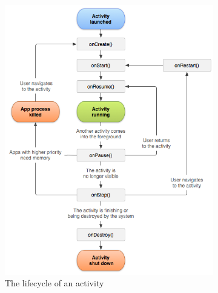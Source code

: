 \begin{figure}[H]
  \centering
    \begin{subfigure}[b]{0.6\textwidth}
      \centering
      \includegraphics[width=\linewidth]{images/activity_lifecycle.png}
      \caption[{The lifecycle of an activity \protect{}}]{The lifecycle of an activity}
   \label{fig:activity_lifecycle}
    \end{subfigure}
    \begin{subfigure}[b]{0.3\textwidth}
      \centering

\end{subfigure}
\end{figure}
